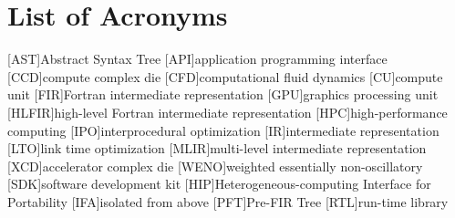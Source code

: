 \section*{List of Acronyms}

\begin{acronym}[paper]
[AST]{Abstract Syntax Tree}
[API]{application programming interface}
[CCD]{compute complex die}
[CFD]{computational fluid dynamics}
[CU]{compute unit}
[FIR]{Fortran intermediate representation}
[GPU]{graphics processing unit}
[HLFIR]{high-level Fortran intermediate representation}
[HPC]{high-performance computing}
[IPO]{interprocedural optimization}
[IR]{intermediate representation}
[LTO]{link time optimization}
[MLIR]{multi-level intermediate representation}
[XCD]{accelerator complex die}
[WENO]{weighted essentially non-oscillatory}
[SDK]{software development kit}
[HIP]{Heterogeneous-computing Interface for Portability}
[IFA]{isolated from above}
[PFT]{Pre-FIR Tree}
[RTL]{run-time library}
\end{acronym}